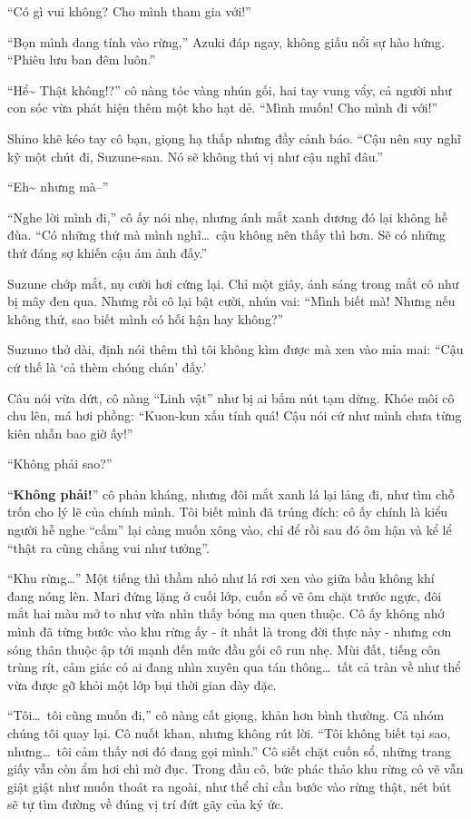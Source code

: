 \documentclass[../main.tex]{subfiles}
\begin{document}
``Có gì vui không? Cho mình tham gia với!''

``Bọn mình đang tính vào rừng,'' Azuki đáp ngay, không giấu nổi sự hào hứng. ``Phiêu lưu ban đêm luôn.''

``Hể\~{} Thật không!?'' cô nàng tóc vàng nhún gối, hai tay vung vẩy, cả người như con sóc vừa phát hiện thêm một kho hạt dẻ. ``Mình muốn! Cho mình đi với!''

Shino khẽ kéo tay cô bạn, giọng hạ thấp nhưng đầy cảnh báo. ``Cậu nên suy nghĩ kỹ một chút đi, Suzune-san. Nó sẽ không thú vị như cậu nghĩ đâu.''

``Eh\~{} nhưng mà--''

``Nghe lời mình đi,'' cô ấy nói nhẹ, nhưng ánh mắt xanh dương đó lại không hề đùa. ``Có những thứ mà mình nghĩ\dots\ cậu không nên thấy thì hơn. Sẽ có những thứ đáng sợ khiến cậu ám ảnh đấy.''

Suzune chớp mắt, nụ cười hơi cứng lại. Chỉ một giây, ánh sáng trong mắt cô như bị mây đen qua. Nhưng rồi cô lại bật cười, nhún vai: ``Mình biết mà! Nhưng nếu không thử, sao biết mình có hối hận hay không?''

Suzuno thở dài, định nói thêm thì tôi không kìm được mà xen vào mỉa mai: ``Cậu cứ thế là `cả thèm chóng chán' đấy.'

Câu nói vừa dứt, cô nàng ``Linh vật'' như bị ai bấm nút tạm dừng. Khóe môi cô chu lên, má hơi phồng: ``Kuon-kun xấu tính quá! Cậu nói cứ như mình chưa từng kiên nhẫn bao giờ ấy!''

``Không phải sao?''

``\textbf{Không phải!}'' cô phản kháng, nhưng đôi mắt xanh lá lại lảng đi, như tìm chỗ trốn cho lý lẽ của chính mình. Tôi biết mình đã trúng đích: cô ấy chính là kiểu người hễ nghe ``cấm'' lại càng muốn xông vào, chỉ để rồi sau đó ôm hận và kể lể ``thật ra cũng chẳng vui như tưởng''.

``Khu rừng\dots'' Một tiếng thì thầm nhỏ như lá rơi xen vào giữa bầu không khí đang nóng lên. Mari đứng lặng ở cuối lớp, cuốn sổ vẽ ôm chặt trước ngực, đôi mắt hai màu mở to như vừa nhìn thấy bóng ma quen thuộc. Cô ấy không nhớ mình đã từng bước vào khu rừng ấy - ít nhất là trong đời thực này - nhưng cơn sóng thân thuộc ập tới mạnh đến mức đầu gối cô run nhẹ. Mùi đất, tiếng côn trùng rít, cảm giác có ai đang nhìn xuyên qua tán thông\dots\ tất cả tràn về như thể vừa được gỡ khỏi một lớp bụi thời gian dày đặc.

``Tôi\dots\ tôi cũng muốn đi,'' cô nàng cất giọng, khản hơn bình thường. Cả nhóm chúng tôi quay lại. Cô nuốt khan, nhưng không rút lời. ``Tôi không biết tại sao, nhưng\dots\ tôi cảm thấy nơi đó đang gọi mình.'' Cô siết chặt cuốn sổ, những trang giấy vẫn còn ẩm hơi chì mờ đục. Trong đầu cô, bức phác thảo khu rừng cô vẽ vẫn giật giật như muốn thoát ra ngoài, như thể chỉ cần bước vào rừng thật, nét bút sẽ tự tìm đường về đúng vị trí đứt gãy của ký ức.
\end{document}
